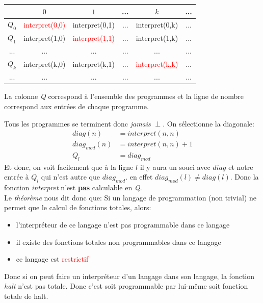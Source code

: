 \documentclass{report}
\begin{document}
\begin{center}
\begin{tabular}{|c|c|c|c|c|c|}
\hline
& $0$ & $1$ & ... & $k$& ...\\
\hline
$Q_0$ & \textcolor{red}{interpret(0,0)} & interpret(0,1) & ... & interpret(0,k) & ...\\
\hline
$Q_1$ & interpret(1,0) & \textcolor{red}{interpret(1,1)} & ... & interpret(1,k) & ...\\
\hline
... & ... & ... & ... & ... & ... \\
\hline
$Q_k$ & interpret(k,0) & interpret(k,1) & ... & \textcolor{red}{interpret(k,k)} & ...\\
\hline
... & ... & ... & ... & ... & ... \\
\hline
\end{tabular}
\end{center}
La colonne \textit{Q} correspond à l'ensemble des programmes et la ligne de nombre correspond aux entrées de chaque programme.

Tous les programmes se terminent donc \textit{jamais} $\perp$. On sélectionne la diagonale:
\begin{align*}
diag(n) &= interpret(n,n)\\
diag_{mod}(n) &= interpret(n,n) + 1\\
Q_l &= diag_{mod}
\end{align*}
Et donc, on voit facilement que à la ligne $l$ il y aura un souci avec $diag$ et notre entrée à $Q_l$ qui n'est autre que $diag_{mod}$. en effet $diag_{mod}(l) \neq diag(l)$. Donc la fonction \textit{interpret} n'est \textbf{pas} calculable en \textit{Q}.\\

Le \textit{théorème} nous dit donc que: Si un langage de programmation (non trivial) ne permet que le calcul de fonctions totales, alors: 
\begin{itemize}
\item l’interpréteur de ce langage n’est pas programmable dans ce langage 
\item il existe des fonctions totales non programmables dans ce langage
\item ce langage est \textcolor{red}{restrictif}
\end{itemize}

Donc si on peut faire un interpréteur d'un langage dans son langage, la fonction \textit{halt} n'est pas totale. Donc c'est soit programmable par lui-même soit fonction totale de halt.\\
\end{document}
